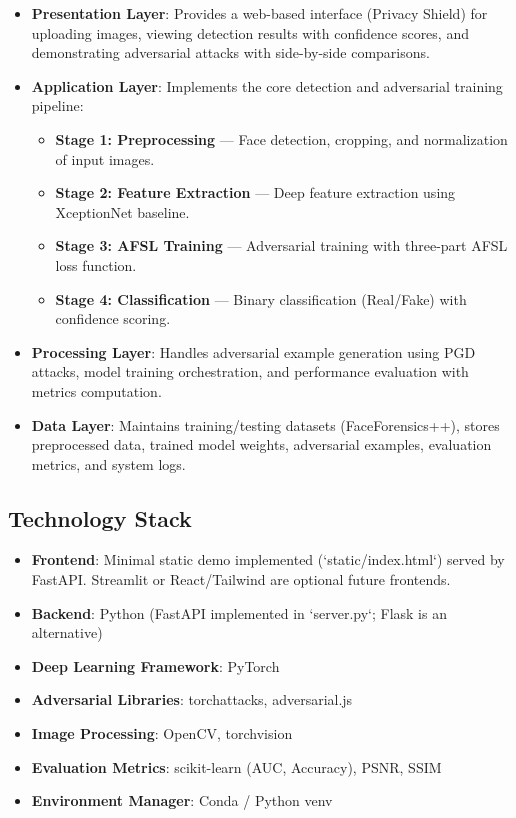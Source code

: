 \documentclass[a4paper,12pt]{article}
\begin{document}
\begin{itemize}
    \item \textbf{Presentation Layer}: 
    Provides a web-based interface (Privacy Shield) for uploading images, viewing detection results with confidence scores, and demonstrating adversarial attacks with side-by-side comparisons.

    \item \textbf{Application Layer}: 
    Implements the core detection and adversarial training pipeline:
    \begin{itemize}
        \item \textbf{Stage 1: Preprocessing} — Face detection, cropping, and normalization of input images.
        \item \textbf{Stage 2: Feature Extraction} — Deep feature extraction using XceptionNet baseline.
        \item \textbf{Stage 3: AFSL Training} — Adversarial training with three-part AFSL loss function.
        \item \textbf{Stage 4: Classification} — Binary classification (Real/Fake) with confidence scoring.
    \end{itemize}

    \item \textbf{Processing Layer}: 
    Handles adversarial example generation using PGD attacks, model training orchestration, and performance evaluation with metrics computation.

    \item \textbf{Data Layer}: 
    Maintains training/testing datasets (FaceForensics++), stores preprocessed data, trained model weights, adversarial examples, evaluation metrics, and system logs.
\end{itemize}

\subsection{Technology Stack}
\begin{itemize}
    \item \textbf{Frontend}: Minimal static demo implemented (`static/index.html`) served by FastAPI. Streamlit or React/Tailwind are optional future frontends.
    \item \textbf{Backend}: Python (FastAPI implemented in `server.py`; Flask is an alternative)
    \item \textbf{Deep Learning Framework}: PyTorch
    \item \textbf{Adversarial Libraries}: torchattacks, adversarial.js
    \item \textbf{Image Processing}: OpenCV, torchvision
    \item \textbf{Evaluation Metrics}: scikit-learn (AUC, Accuracy), PSNR, SSIM
    \item \textbf{Environment Manager}: Conda / Python venv
\end{itemize}
\end{document}
